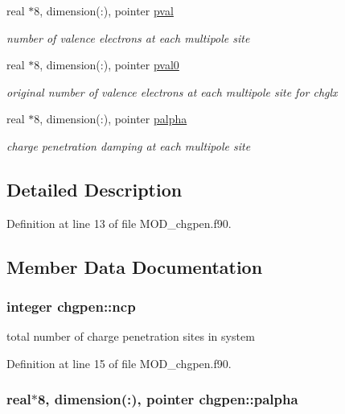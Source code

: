 \begin{DoxyCompactItemize}
real $\ast$8, dimension(\-:), pointer \hyperlink{classchgpen_a45f461ef1ab04e18781d0ef0b8e968be}{pval}
\begin{DoxyCompactList}\small\item\em number of valence electrons at each multipole site \end{DoxyCompactList}\item 
real $\ast$8, dimension(\-:), pointer \hyperlink{classchgpen_a1f5eb04050c62935ac8869e880b99698}{pval0}
\begin{DoxyCompactList}\small\item\em original number of valence electrons at each multipole site for chglx \end{DoxyCompactList}\item 
real $\ast$8, dimension(\-:), pointer \hyperlink{classchgpen_a9790635abe24f4a2826b56c2ab0a0427}{palpha}
\begin{DoxyCompactList}\small\item\em charge penetration damping at each multipole site \end{DoxyCompactList}\end{DoxyCompactItemize}


\subsection{Detailed Description}


Definition at line 13 of file M\-O\-D\-\_\-chgpen.\-f90.



\subsection{Member Data Documentation}
\hypertarget{classchgpen_a0d389594b74c91aec7d51c5857af719b}{
\subsubsection[{ncp}]{\setlength{\rightskip}{0pt plus 5cm}integer chgpen\-::ncp}}\label{classchgpen_a0d389594b74c91aec7d51c5857af719b}


total number of charge penetration sites in system 



Definition at line 15 of file M\-O\-D\-\_\-chgpen.\-f90.

\hypertarget{classchgpen_a9790635abe24f4a2826b56c2ab0a0427}{
\subsubsection[{palpha}]{\setlength{\rightskip}{0pt plus 5cm}real$\ast$8, dimension(\-:), pointer chgpen\-::palpha}}\label{classchgpen_a9790635abe24f4a2826b56c2ab0a0427}


